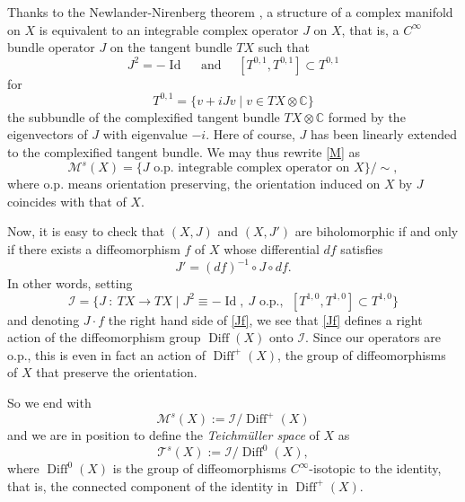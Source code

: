 \documentclass[10pt]{amsart}
\let\mathcal\mathscr
\DeclareMathOperator{\Diff}{Diff}
\DeclareMathOperator{\Id}{Id}
\theoremstyle{plain}
\theoremstyle{definition}
\theoremstyle{remark}
\numberwithin{equation}{section}
\newcommand{\CC}{{\mathbb{C}}}
\newcommand{\cI}{\mathcal{I}}
\begin{document}
Thanks to the Newlander-Nirenberg theorem \cite{NN}, a structure of a complex manifold on $X$ is equivalent to an integrable complex operator $J$ on $X$, that is, a $C^\infty$ bundle operator $J$ on the tangent bundle $TX$ such that
\begin{equation}
\label{ico}
J^2=- \Id\quad\text{ and }\quad [T^{0,1},T^{0,1}]\subset T^{0,1}
\end{equation}
for
\begin{equation}
\label{T01}
T^{0,1}=\{v+iJv\mid v\in TX\otimes\CC\}
\end{equation}
the subbundle of the complexified tangent bundle $TX\otimes\CC$ formed by the eigenvectors of $J$ with eigenvalue $-i$. Here of course, $J$ has been linearly extended to the complexified tangent bundle. We may thus rewrite \eqref{M} as
\begin{equation}
\label{M2}
\mathcal M^s(X)=\{J\text{ o.p. integrable complex operator on } X\}/\sim,
\end{equation}
where o.p. means orientation preserving, \ie the orientation induced on $X$ by $J$ coincides with that of $X$.

Now, it is easy to check that $(X,J)$ and $(X,J')$ are biholomorphic if and only if there exists a diffeomorphism $f$ of $X$ whose differential $df$ satisfies
\begin{equation}
\label{Jf}
J'=(df)^{-1}\circ J\circ df.
\end{equation}
In other words, setting
\begin{equation}
\label{I}
\cI=\{J\ :\ TX\longrightarrow TX\mid J^2\equiv -\Id,\ J\text{ o.p.},\ \ [T^{1,0}, T^{1,0}]\subset T^{1,0}\}
\end{equation}
and denoting $J\cdot f$ the right hand side of \eqref{Jf}, we see that \eqref{Jf} defines a right action of the diffeomorphism group $\Diff(X)$ onto $\cI$. Since our operators are o.p., this is even in fact an action of $\Diff^+(X)$, the group of diffeomorphisms of $X$ that preserve the orientation.

So we end with
\begin{equation}
\label{Riem}
\mathcal M^s(X):=\cI\big /\Diff^+(X)
\end{equation}
and we are in position to define the \emph{Teichmüller space} of $X$ as
\begin{equation}
\label{Teich}
\mathcal T^s(X):=\cI\big /\Diff^0(X),
\end{equation}
where $\Diff^0(X)$ is the group of diffeomorphisms $C^\infty$-isotopic to the identity, that is, the connected component of the identity in $\Diff^+(X)$.
\end{document}
